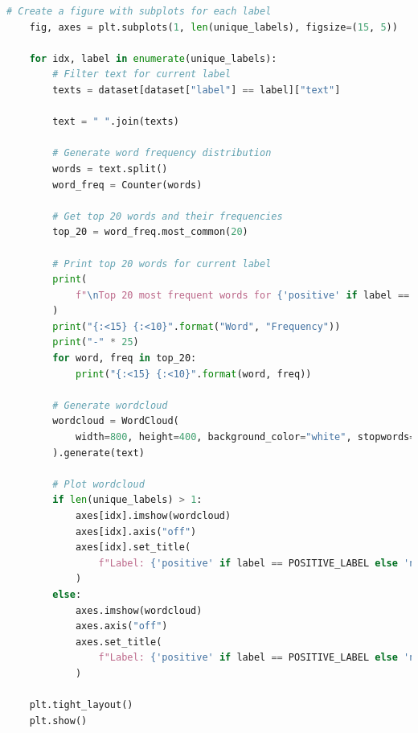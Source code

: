 \documentclass[12pt]{article}
\begin{document}
\begin{lstlisting}[language=Python]
    # Create a figure with subplots for each label
    fig, axes = plt.subplots(1, len(unique_labels), figsize=(15, 5))

    for idx, label in enumerate(unique_labels):
        # Filter text for current label
        texts = dataset[dataset["label"] == label]["text"]

        text = " ".join(texts)

        # Generate word frequency distribution
        words = text.split()
        word_freq = Counter(words)

        # Get top 20 words and their frequencies
        top_20 = word_freq.most_common(20)

        # Print top 20 words for current label
        print(
            f"\nTop 20 most frequent words for {'positive' if label == POSITIVE_LABEL else 'negative'} reviews:"
        )
        print("{:<15} {:<10}".format("Word", "Frequency"))
        print("-" * 25)
        for word, freq in top_20:
            print("{:<15} {:<10}".format(word, freq))

        # Generate wordcloud
        wordcloud = WordCloud(
            width=800, height=400, background_color="white", stopwords=set()
        ).generate(text)

        # Plot wordcloud
        if len(unique_labels) > 1:
            axes[idx].imshow(wordcloud)
            axes[idx].axis("off")
            axes[idx].set_title(
                f"Label: {'positive' if label == POSITIVE_LABEL else 'negative'}"
            )
        else:
            axes.imshow(wordcloud)
            axes.axis("off")
            axes.set_title(
                f"Label: {'positive' if label == POSITIVE_LABEL else 'negative'}"
            )

    plt.tight_layout()
    plt.show()
    
\end{lstlisting}
\end{document}
